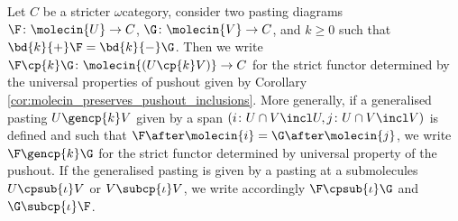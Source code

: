 \begin{dfn} 
    Let \( C \) be a stricter \( \omega \)\nbd category, consider two pasting diagrams \( \F \colon \molecin{U} \to C \), \( \G \colon \molecin{V} \to C \), and \( k \geq 0 \) such that \( \bd{k}{+} \F = \bd{k}{-} \G \).
    Then we write \( \F \cp{k} \G \colon \molecin{(U \cp{k} V)} \to C \) for the strict functor determined by the universal properties of pushout given by Corollary \ref{cor:molecin_preserves_pushout_inclusions}.
    More generally, if a generalised pasting \( U \gencp{k} V \) given by a span \( (i \colon U \cap V \incl U, j \colon U \cap V \incl V) \) is defined and such that \( \F \after \molecin{i} = \G \after \molecin{j} \), we write \( \F \gencp{k} \G \) for the strict functor determined by universal property of the pushout.
    If the generalised pasting is given by a pasting at a submolecules \( U \cpsub{\iota} V \) or \( V \subcp{\iota} V \), we write accordingly \( \F \cpsub{\iota} \G \) and \( \G \subcp{\iota} \F \).
\end{dfn}


